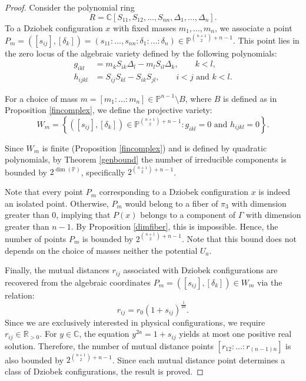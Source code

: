 \documentclass{amsart}
\theoremstyle{definition}
\theoremstyle{remark}
\numberwithin{equation}{section}
\begin{document}
\begin{proof}
    Consider the polynomial ring $$R=\mathbb{C}[S_{11}, S_{12}, \dots, S_{nn}, \Delta_1, \dots, \Delta_n].$$
    To a Dziobek configuration $x$ with fixed masses $m_1, \dots, m_n$, we associate a point $P_{m}=([s_{ij}], [\delta_k])=(s_{11}: \dots, s_{nn}: \delta_1: \dots: \delta_n) \in \mathbb{P}^{\binom{n+1}{2}+n-1}$. This point lies in the zero locus of the algebraic variety defined by the following polynomials:
    \begin{align}
        g_{ikl} &= m_k S_{ik}\Delta_l - m_l S_{il}\Delta_k, \qquad k < l, \\
        h_{ijkl} &= S_{ij}S_{kl} - S_{ik}S_{jl}, \qquad i < j \text{ and } k < l.
    \end{align}

    For a choice of mass $m=[m_1:\dots:m_n] \in \mathbb{P}^{n-1} \setminus B$, where $B$ is defined as in Proposition \ref{fincomplex}, we define the projective variety:
    $$W_m = \left\{ ([s_{ij}],[\delta_k]) \in \mathbb{P}^{\binom{n+1}{2}+n-1} : g_{ikl}=0 \text{ and } h_{ijkl}=0 \right\}.$$

    Since $W_m$ is finite (Proposition \ref{fincomplex}) and is defined by quadratic polynomials, by Theorem \ref{genbound} the number of irreducible components  is bounded by $2^{\dim(\mathbb{P})}$, specifically $2^{\binom{n+1}{2}+n-1}$.
    
    Note that every point $P_m$ corresponding to a Dziobek configuration $x$ is indeed an isolated point. Otherwise, $P_m$ would belong to a fiber of $\pi_3$ with dimension greater than $0$, implying that $P(x)$ belongs to a component of $\Gamma$ with dimension greater than $n-1$. By Proposition \ref{dimfiber}, this is impossible. Hence, the number of points $P_m$ is bounded by $2^{\binom{n+1}{2}+n-1}$. Note that this bound does not depends on the choice of masses neither the potential $U_a$.

    Finally, the mutual distances $r_{ij}$ associated with Dziobek configurations are recovered from the algebraic coordinates $P_m=([s_{ij}], [\delta_k]) \in W_m$ via the relation:
    $$ r_{ij} = r_{0}(1 + s_{ij})^{\frac{1}{2a}}. $$
    Since we are exclusively interested in physical configurations, we require $r_{ij} \in \mathbb{R}_{>0}$. For $y \in \mathbb{C}$, the equation $y^{2a} = 1 + s_{ij}$ yields at most one positive real solution. Therefore, the number of mutual distance points $[r_{12}: \dots: r_{(n-1)n}]$ is also bounded by $2^{\binom{n+1}{2}+n-1}$. Since each mutual distance point determines a class of Dziobek configurations, the result is proved.
\end{proof}
\end{document}
